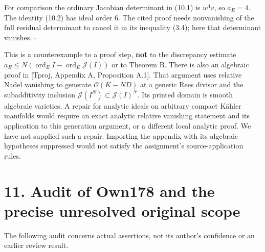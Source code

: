 \documentclass[
  11pt,
]{article}
\begin{document}
For comparison the ordinary Jacobian determinant in (10.1) is \(w^4v\),
so \(a_E=4\). The identity (10.2) has ideal order \(6\). The cited proof
needs nonvanishing of the full residual determinant to cancel it in its
inequality (3.4); here that determinant vanishes. \(\square\)

This is a counterexample to a proof step, \textbf{not} to the
discrepancy estimate
\(a_E\leq N(\operatorname{ord}_EI-\operatorname{ord}_E\mathcal J(I))\)
or to Theorem B. There is also an algebraic proof in {[}Tproj, Appendix
A, Proposition A.1{]}. That argument uses relative Nadel vanishing to
generate \(\mathcal O(K-ND)\) at a generic Rees divisor and the
subadditivity inclusion \(\mathcal J(I^N)\subset\mathcal J(I)^N\). Its
printed domain is smooth algebraic varieties. A repair for analytic
ideals on arbitrary compact Kähler manifolds would require an exact
analytic relative vanishing statement and its application to this
generation argument, or a different local analytic proof. We have not
supplied such a repair. Importing the appendix with its algebraic
hypotheses suppressed would not satisfy the assignment's
source-application rules.

\section{11. Audit of Own178 and the precise unresolved original
scope}\label{audit-of-own178-and-the-precise-unresolved-original-scope}

The following audit concerns actual assertions, not its author's
confidence or an earlier review result.
\end{document}
